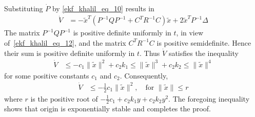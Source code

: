 \documentclass[11pt,a4paper,oneside]{book}
\numberwithin{equation}{section}
\theoremstyle{it}
\theoremstyle{definition}
\begin{document}
Substituting $\dot{P}$ by \eqref{ekf_khalil_eq_10} results in
\begin{equation*}
	\begin{aligned}
		\dot{V}&=-\tilde{x}^T(P^{-1}QP^{-1}+C^TR^{-1}C)\tilde{x}+2\tilde{x}^TP^{-1}\Delta
	\end{aligned}
\end{equation*}
The matrix $P^{-1}QP^{-1}$ is positive definite uniformly in $t$, in view of~\eqref{ekf_khalil_eq_12}, and the matrix $C^TR^{-1}C$ is positive semidefinite. Hence their sum is positive definite uniformly in $t$. Thus $\dot{V}$ satisfies the inequality
\begin{equation*}
	\begin{aligned}
		\dot{V}&\le-c_1\|\tilde{x}\|^2+c_2k_1\le\|\tilde{x}\|^3+c_2k_2\le\|\tilde{x}\|^4
	\end{aligned}
\end{equation*}
for some positive constants $c_1$ and $c_2$. Consequently,
\begin{equation*}
	\begin{aligned}
		\dot{V}&\le-\frac{1}{2}c_1\|\tilde{x}\|^2,\quad\text{for }\|\tilde{x}\|\le r
	\end{aligned}
\end{equation*}
where $r$ is the positive root of $-\frac{1}{2}c_1+c_2k_1y+c_2k_2y^2$. The foregoing inequality shows that origin is exponentially stable and completes the proof. 
\end{document}
